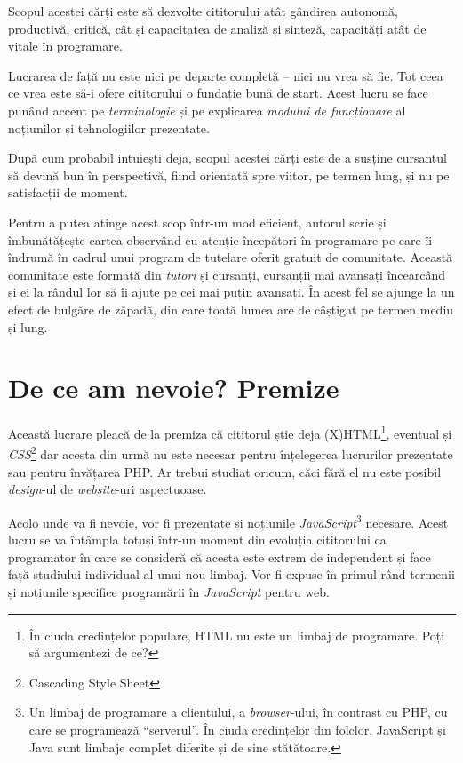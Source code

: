 Scopul acestei cărți este să dezvolte cititorului atât gândirea autonomă,
productivă, critică, cât și capacitatea de analiză și sinteză, capacități atât
de vitale în programare.

Lucrarea de față nu este nici pe departe completă -- nici nu vrea să fie.  Tot
ceea ce vrea este să-i ofere cititorului o fundație bună de start. Acest lucru
se face punând accent pe \textit{terminologie} și pe explicarea \textit{modului
de funcționare} al noțiunilor și tehnologiilor prezentate.

După cum probabil intuiești deja, scopul acestei cărți este de a susține
cursantul să devină bun în perspectivă, fiind orientată spre viitor, pe termen
lung, și nu pe satisfacții de moment.

Pentru a putea atinge acest scop într-un mod eficient, autorul scrie și
îmbunătățește cartea observând cu atenție începători în programare pe care îi
îndrumă în cadrul unui program de tutelare oferit gratuit de comunitate.
Această comunitate este formată din \textit{tutori} și cursanți, cursanții mai
avansați încearcând și ei la rândul lor să îi ajute pe cei mai puțin avansați.
În acest fel se ajunge la un efect de bulgăre de zăpadă, din care toată lumea
are de câștigat pe termen mediu și lung.

\section*{De ce am nevoie? Premize}
{}

Această lucrare pleacă de la premiza că cititorul știe deja
(X)HTML\footnote{În ciuda credințelor populare, HTML nu este un limbaj de
programare. Poți să argumentezi de ce?}, eventual și
\textsl{CSS}\footnote{Cascading Style Sheet}
dar acesta din urmă nu este necesar pentru
înțelegerea lucrurilor prezentate sau pentru învățarea PHP. Ar trebui studiat
oricum, căci fără el nu este posibil
\textsl{design}-ul
de \textit{website}-uri aspectuoase.

Acolo unde va fi nevoie, vor fi prezentate și noțiunile
\textsl{JavaScript}\footnote{Un
limbaj de programare a clientului, a \textsl{browser}-ului, în contrast cu PHP,
cu care se programează ``serverul''.  În ciuda credințelor din folclor,
JavaScript și Java sunt limbaje complet diferite și de sine stătătoare.}
necesare. Acest lucru se va întâmpla totuși într-un moment din evoluția
cititorului ca programator în care se consideră că acesta este extrem de
independent și face față studiului individual al unui nou limbaj. Vor fi expuse
în primul rând termenii și noțiunile specifice programării în
\textit{JavaScript} pentru web.

